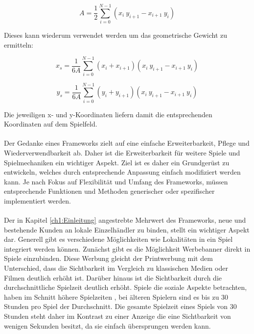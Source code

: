 \begin{equation}
A = \frac{1}{2}\sum_{i=0}^{N-1} (x_i\ y_{i+1} - x_{i+1}\ y_i)
\end{equation}

Dieses kann wiederum verwendet werden um das geometrische Gewicht zu ermitteln:

\begin{equation}
x_s = \frac{1}{6A}\sum_{i=0}^{N-1}(x_i+x_{i+1})(x_i\ y_{i+1} - x_{i+1}\ y_i)
\end{equation}

\begin{equation}
y_s = \frac{1}{6A}\sum_{i=0}^{N-1}(y_i+y_{i+1})(x_i\ y_{i+1} - x_{i+1}\ y_i)
\end{equation}

Die jeweiligen x- und y-Koordinaten liefern damit die entsprechenden Koordinaten auf dem Spielfeld.
\\\\
Der Gedanke eines Frameworks zielt auf eine einfache Erweiterbarkeit, Pflege und Wiederverwendbarkeit ab. Daher ist die Erweiterbarkeit für weitere Spiele und Spielmechaniken ein wichtiger Aspekt. Ziel ist es daher ein Grundgerüst zu entwickeln, welches durch entsprechende Anpassung einfach modifiziert werden kann.
Je nach Fokus auf Flexibilität und Umfang des Frameworks, müssen entsprechende Funktionen und Methoden generischer oder spezifischer implementiert werden.
\\\\
Der in Kapitel \ref{ch1:Einleitung} angestrebte Mehrwert des Frameworks, neue und bestehende Kunden an lokale Einzelhändler zu binden, stellt ein wichtiger Aspekt dar. Generell gibt es verschiedene Möglichkeiten wie Lokalitäten in ein Spiel integriert werden können.\cite{Nelson.2002}
Zunächst gibt es die Möglichkeit Werbebanner direkt in Spiele einzubinden.\cite{Nelson.2004} Diese Werbung gleicht der Printwerbung mit dem Unterschied, dass die Sichtbarkeit im Vergleich zu klassischen Medien oder Filmen deutlich erhöht ist.\cite{Edery.2008} Darüber hinaus ist die Sichtbarkeit durch die durchschnittliche Spielzeit deutlich erhöht. Spiele die soziale Aspekte betrachten, haben im Schnitt höhere Spielzeiten \cite{Ducheneaut.2006}, bei älteren Spielern sind es bis zu 30 Stunden pro Spiel der Durchschnitt. Die gesamte Spielzeit eines Spiels von 30 Stunden steht daher im Kontrast zu einer Anzeige  die eine Sichtbarkeit von wenigen Sekunden besitzt, da sie einfach übersprungen werden kann.
\\\\
